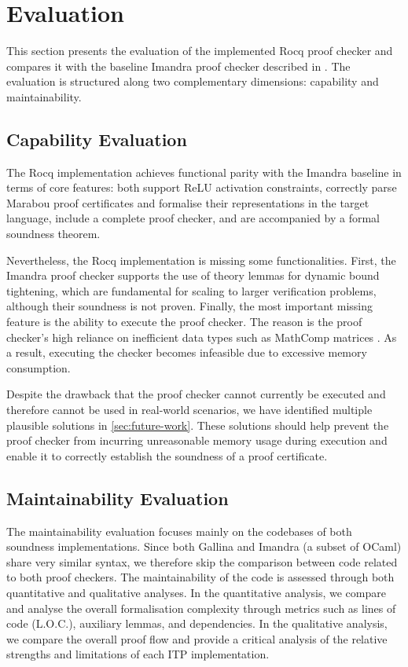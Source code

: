 \section{Evaluation} \label{sec:evaluation}
This section presents the evaluation of the implemented Rocq proof checker and compares it with the baseline Imandra proof checker described in \cite{certified_proof_checker}. The evaluation is structured along two complementary dimensions: capability and maintainability.

\subsection{Capability Evaluation}

The Rocq implementation achieves functional parity with the Imandra baseline in terms of core features: both support ReLU activation constraints, correctly parse Marabou proof certificates and formalise their representations in the target language, include a complete proof checker, and are accompanied by a formal soundness theorem.

Nevertheless, the Rocq implementation is missing some functionalities. First, the Imandra proof checker supports the use of theory lemmas for dynamic bound tightening, which are fundamental for scaling to larger verification problems, although their soundness is not proven. Finally, the most important missing feature is the ability to execute the proof checker. The reason is the proof checker's high reliance on inefficient data types such as MathComp matrices \cite{refinement_algebra_rocq}. As a result, executing the checker becomes infeasible due to excessive memory consumption.

Despite the drawback that the proof checker cannot currently be executed and therefore cannot be used in real-world scenarios, we have identified multiple plausible solutions in \autoref{sec:future-work}. These solutions should help prevent the proof checker from incurring unreasonable memory usage during execution and enable it to correctly establish the soundness of a proof certificate.

\subsection{Maintainability Evaluation}
The maintainability evaluation focuses mainly on the codebases of both soundness implementations. Since both Gallina and Imandra (a subset of OCaml) share very similar syntax, we therefore skip the comparison between code related to both proof checkers. The maintainability of the code is assessed through both quantitative and qualitative analyses. In the quantitative analysis, we compare and analyse the overall formalisation complexity through metrics such as lines of code (L.O.C.), auxiliary lemmas, and dependencies. In the qualitative analysis, we compare the overall proof flow and provide a critical analysis of the relative strengths and limitations of each ITP implementation.

